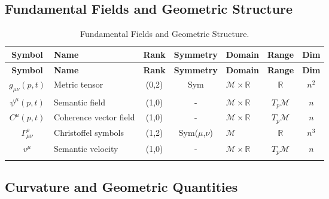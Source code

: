 
\subsection{Fundamental Fields and Geometric Structure}
\label{2.2.1:fundamental_fields_and_geometric_structure}

{\small
\renewcommand{\arraystretch}{1.1}
\begin{longtable}{|c|p{5.5cm}|c|c|p{1.8cm}|c|c|}
\hline
\textbf{Symbol} & \textbf{Name} & \textbf{Rank} & \textbf{Symmetry} & \textbf{Domain} & \textbf{Range} & \textbf{Dim} \\
\hline
\endfirsthead
\hline
\textbf{Symbol} & \textbf{Name} & \textbf{Rank} & \textbf{Symmetry} & \textbf{Domain} & \textbf{Range} & \textbf{Dim} \\
\hline
\endhead
\(g_{\mu\nu}(p,t)\) & Metric tensor & (0,2) & Sym & \(\mathcal{M} \times \mathbb{R}\) & \(\mathbb{R}\) & \(n^2\) \\
\hline
\(\psi^\mu(p,t)\) & Semantic field & (1,0) & - & \(\mathcal{M} \times \mathbb{R}\) & \(T_p\mathcal{M}\) & \(n\) \\
\hline
\(C^\mu(p,t)\) & Coherence vector field & (1,0) & - & \(\mathcal{M} \times \mathbb{R}\) & \(T_p\mathcal{M}\) & \(n\) \\
\hline
\(\Gamma^\rho_{\mu\nu}\) & Christoffel symbols & (1,2) & Sym(\(\mu\),\(\nu\)) & \(\mathcal{M}\) & \(\mathbb{R}\) & \(n^3\) \\
\hline
\(v^\mu\) & Semantic velocity & (1,0) & - & \(\mathcal{M} \times \mathbb{R}\) & \(T_p\mathcal{M}\) & \(n\) \\
\hline
\caption{Fundamental Fields and Geometric Structure.}
\end{longtable}
}


\subsection{Curvature and Geometric Quantities}
\label{2.2.2:curvature_and_geometric_quantities}

